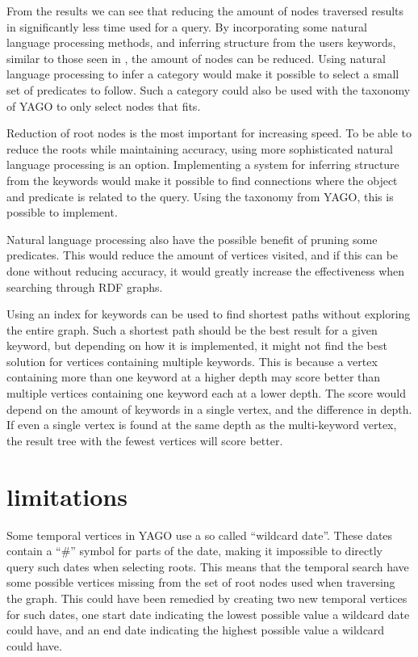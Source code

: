 From the results we can see that reducing the amount of nodes traversed results in significantly less time used for a query. By incorporating some natural language processing methods, and inferring structure from the users keywords, similar to those seen in \cite{4812421, aqualog}, the amount of nodes can be reduced. Using natural language processing to infer a category would make it possible to select a small set of predicates to follow. Such a category could also be used with the taxonomy of YAGO to only select nodes that fits.

Reduction of root nodes is the most important for increasing speed. To be able to reduce the roots while maintaining accuracy, using more sophisticated natural language processing is an option. Implementing a system for inferring structure from the keywords would make it possible to find connections where the object and predicate is related to the query. Using the taxonomy from YAGO, this is possible to implement.

Natural language processing also have the possible benefit of pruning some predicates. This would reduce the amount of vertices visited, and if this can be done without reducing accuracy, it would greatly increase the effectiveness when searching through RDF graphs.

Using an index for keywords can be used to find shortest paths without exploring the entire graph. Such a shortest path should be the best result for a given keyword, but depending on how it is implemented, it might not find the best solution for vertices containing multiple keywords. This is because a vertex containing more than one keyword at a higher depth may score better than multiple vertices containing one keyword each at a lower depth. The score would depend on the amount of keywords in a single vertex, and the difference in depth. If even a single vertex is found at the same depth as the multi-keyword vertex, the result tree with the fewest vertices will score better. 


\section{limitations}

Some temporal vertices in YAGO use a so called ``wildcard date''. These dates contain a ``\#'' symbol for parts of the date, making it impossible to directly query such dates when selecting roots. This means that the temporal search have some possible vertices missing from the set of root nodes used when traversing the graph. This could have been remedied by creating two new temporal vertices for such dates, one start date indicating the lowest possible value a wildcard date could have, and an end date indicating the highest possible value a wildcard could have.

